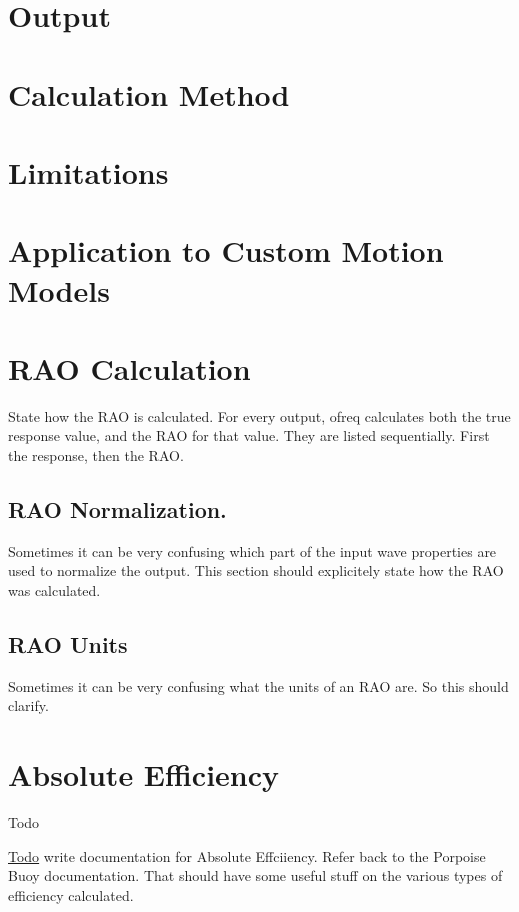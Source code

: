 \section*{Output}

\section*{Calculation Method}

\section*{Limitations}

\section*{Application to Custom Motion Models}

\section*{R\-A\-O Calculation}

State how the R\-A\-O is calculated. For every output, ofreq calculates both the true response value, and the R\-A\-O for that value. They are listed sequentially. First the response, then the R\-A\-O.

\subsection*{R\-A\-O Normalization.}

Sometimes it can be very confusing which part of the input wave properties are used to normalize the output. This section should explicitely state how the R\-A\-O was calculated.

\subsection*{R\-A\-O Units}

Sometimes it can be very confusing what the units of an R\-A\-O are. So this should clarify. \hypertarget{efficiency_absolute}{}\section{Absolute Efficiency}\label{efficiency_absolute}
\begin{DoxyRefDesc}{Todo}
\item[\hyperlink{todo__todo000010}{Todo}]write documentation for Absolute Effciiency. Refer back to the Porpoise Buoy documentation. That should have some useful stuff on the various types of efficiency calculated.\end{DoxyRefDesc}


